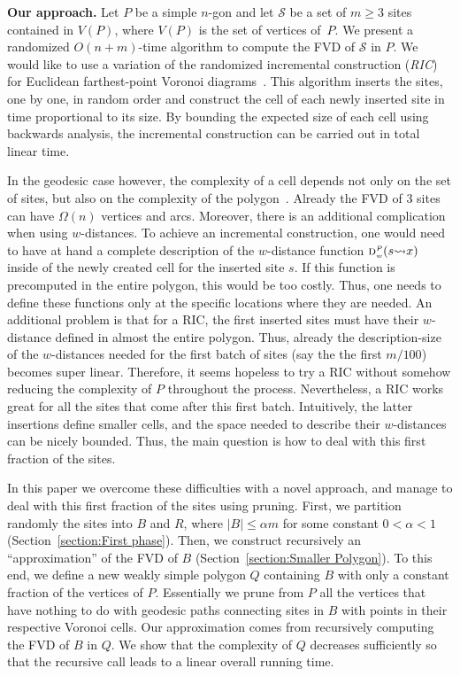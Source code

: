 \documentclass[a4paper,UKenglish]{socg-lipics-v2018}
\newcommand{\s}{\mathcal S}
\newcommand{\dd}[3][P]{\ensuremath{\textsc{d}_{\scriptscriptstyle w}^{\scriptscriptstyle #1}(#2 {\leadsto} #3)}}
\begin{document}
\textbf{Our approach.}
Let  $P$ be a simple $n$-gon and let $\s$ be a set of $m\geq 3$ sites contained in $V(P)$, where $V(P)$ is the set of vertices of~$P$.
We present a randomized $O(n+m)$-time algorithm to compute the FVD of $\s$ in $P$.
We would like to use a variation of the randomized incremental construction (\emph{RIC}) for Euclidean farthest-point Voronoi diagrams~\cite{de2000computational}.
This algorithm inserts the sites, one by one, in random order and construct the cell of each newly inserted site in time proportional to its size. 
By bounding the expected size of each cell using backwards analysis, the incremental construction can be carried out in total linear time. 

In the geodesic case however, the complexity of a cell depends not only on the set of sites, but also on the complexity of the polygon~\cite{aronov1989geodesic}. 
Already the FVD of 3 sites can have $\Omega(n)$ vertices and arcs.
Moreover, there is an additional complication when using $w$-distances.
To achieve an incremental construction, one would need to have at hand a complete description of the $w$-distance function $\dd{s}{x}$ inside of the newly created cell for the inserted site $s$.
If this function is precomputed in the entire polygon, this would be too costly. 
Thus, one needs to define these functions only at the specific locations where they are needed. 
An additional problem is that for a RIC, the first inserted sites must have their $w$-distance defined in almost the entire polygon.
Thus, already the description-size of the $w$-distances needed for the first batch of sites (say the the first $m/100$) becomes super linear. 
Therefore, it seems hopeless to try a RIC without somehow reducing the complexity of $P$ throughout the process. 
Nevertheless, a RIC works great for all the sites that come after this first batch. 
Intuitively,  the latter insertions define smaller cells, and the space needed to describe their $w$-distances can be nicely bounded.
Thus, the main question is how to deal with this first fraction of the sites.

In this paper we overcome these difficulties with a novel approach, and manage to deal with this first fraction of the sites using pruning.
First, we partition randomly the sites into $B$ and $R$, where $|B| \leq \alpha m$ for some constant $0 < \alpha < 1$ (Section~\ref{section:First phase}).
Then, we construct recursively an ``approximation'' of the FVD of $B$ (Section~\ref{section:Smaller Polygon}). 
To this end, we define a new weakly simple polygon $Q$ containing $B$ with only a constant fraction of the vertices of $P$. 
Essentially we prune from $P$ all the vertices that have nothing to do with geodesic paths connecting sites in $B$ with points in their respective Voronoi cells. 
Our approximation comes from recursively computing the FVD of $B$ in $Q$. 
We show that the complexity of $Q$ decreases sufficiently so that the recursive call leads to a linear overall running time.
\end{document}
